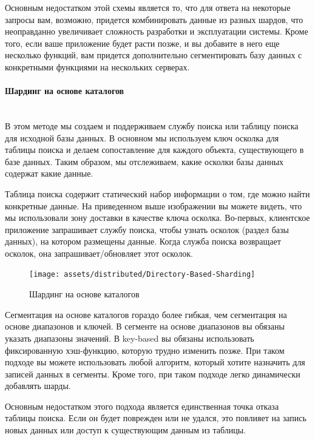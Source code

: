 Основным недостатком этой схемы является то, что для ответа на некоторые запросы вам, возможно, придется комбинировать
данные из разных шардов, что неоправданно увеличивает сложность разработки и эксплуатации системы. Кроме того, если
ваше приложение будет расти позже, и вы добавите в него еще несколько функций, вам придется дополнительно сегментировать
базу данных с конкретными функциями на нескольких серверах. \autocite{DatabaseSharding}

\paragraph{Шардинг на основе каталогов} ~\\
В этом методе мы создаем и поддерживаем службу поиска или таблицу поиска для исходной базы данных. В основном мы
используем ключ осколка для таблицы поиска и делаем сопоставление для каждого объекта, существующего в базе данных.
Таким образом, мы отслеживаем, какие осколки базы данных содержат какие данные.

Таблица поиска содержит статический набор информации о том, где можно найти конкретные данные. На приведенном выше
изображении вы можете видеть, что мы использовали зону доставки в качестве ключа осколка. Во-первых, клиентское
приложение запрашивает службу поиска, чтобы узнать осколок (раздел базы данных), на котором размещены данные. Когда
служба поиска возвращает осколок, она запрашивает/обновляет этот осколок.

\begin{figure}[H]
    \centering
    \texttt{[image: assets/distributed/Directory-Based-Sharding]}
    \caption{Шардинг на основе каталогов}
    \label{fig:Directory-Based-Sharding}
\end{figure}

Сегментация на основе каталогов гораздо более гибкая, чем сегментация на основе диапазонов и ключей. В сегменте на
основе диапазонов вы обязаны указать диапазоны значений. В key-based вы обязаны использовать фиксированную хэш-функцию,
которую трудно изменить позже. При таком подходе вы можете использовать любой алгоритм, который хотите назначить для
записей данных в сегменты. Кроме того, при таком подходе легко динамически добавлять шарды.

Основным недостатком этого подхода является единственная точка отказа таблицы поиска. Если он будет поврежден или не
удался, это повлияет на запись новых данных или доступ к существующим данным из таблицы. \autocite{DatabaseSharding}

